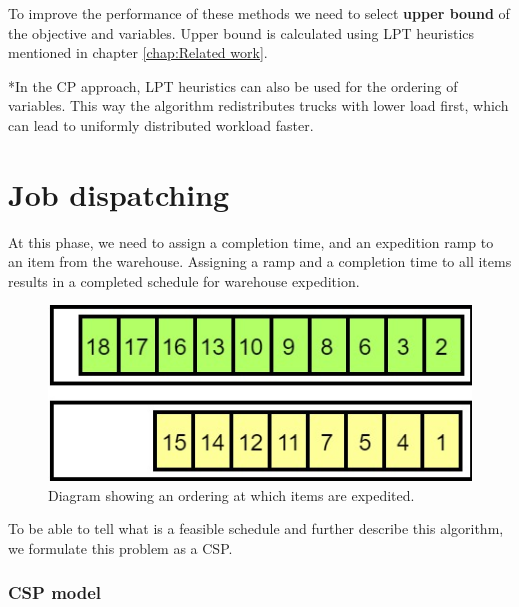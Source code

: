 \documentclass{ctuthesis}
\begin{document}
To improve the performance of these methods we need to select \textbf{upper bound} of the objective and variables. Upper bound is calculated using LPT heuristics mentioned in chapter \ref{chap:Related work}.


*In the CP approach, LPT heuristics can also be used for the ordering of variables. This way the algorithm redistributes trucks with lower load first, which can lead to uniformly distributed workload faster.


\section{Job dispatching}

At this phase, we need to assign a completion time, and an expedition ramp to an item from the warehouse. Assigning a ramp and a completion time to all items results in a completed schedule for warehouse expedition. 

\begin{figure}[h]
\includegraphics[width=0.8\linewidth]{order.jpg}
\caption{Diagram showing an ordering at which items are expedited.}
\label{order}
\end{figure}

To be able to tell what is a feasible schedule and further describe this algorithm, we formulate this problem as a CSP. 

\subsubsection{CSP model}
\end{document}
